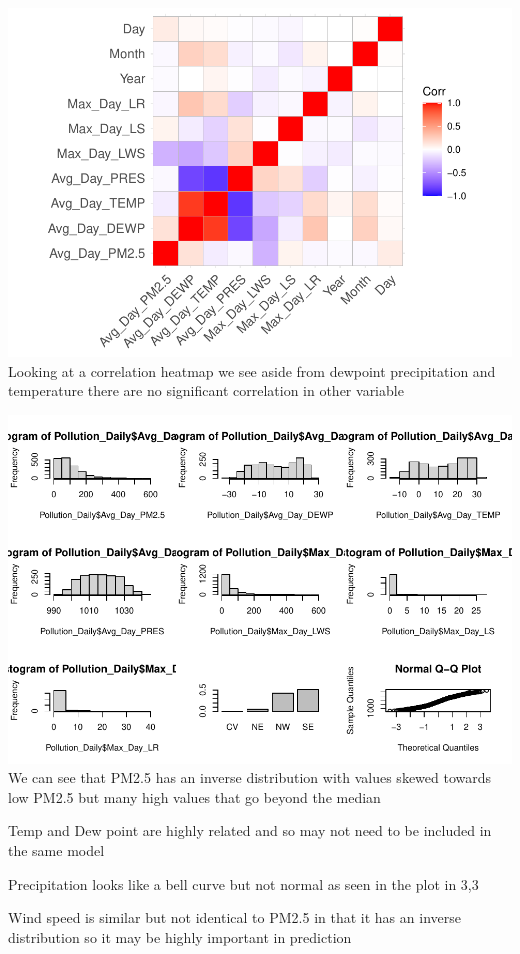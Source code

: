 \documentclass[
]{article}
\begin{document}
\includegraphics{Final_Project_2_files/figure-latex/unnamed-chunk-3-1.pdf}
Looking at a correlation heatmap we see aside from dewpoint
precipitation and temperature there are no significant correlation in
other variable

\includegraphics{Final_Project_2_files/figure-latex/unnamed-chunk-4-1.pdf}
We can see that PM2.5 has an inverse distribution with values skewed
towards low PM2.5 but many high values that go beyond the median

Temp and Dew point are highly related and so may not need to be included
in the same model

Precipitation looks like a bell curve but not normal as seen in the plot
in 3,3

Wind speed is similar but not identical to PM2.5 in that it has an
inverse distribution so it may be highly important in prediction
\end{document}
